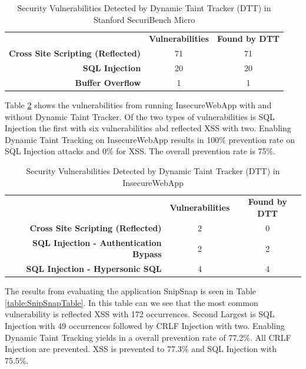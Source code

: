 \begin{table}[!hbt]
  \centering
  \caption{Security Vulnerabilities Detected by Dynamic Taint Tracker (DTT) in Stanford SecuriBench Micro}
  \label{table:MicroTable}
    \begin{tabular}{rcc}
      & \textbf{Vulnerabilities} & \textbf{Found by DTT} \\
      \textbf{Cross Site Scripting (Reflected)} & 71            & 71  \\
      \textbf{SQL Injection}                    & 20            & 20  \\
      \textbf{Buffer Overflow}                  & 1             & 1  
    \end{tabular}
\end{table}

Table \ref{table:InsecureTable} shows the vulnerabilities from running InsecureWebApp \parencite{insecure} with and without Dynamic Taint Tracker. Of the two types of vulnerabilities is SQL Injection the first with six vulnerabilities abd reflected XSS with two. Enabling Dynamic Taint Tracking on InsecureWebApp \parencite{insecure} results in 100\% prevention rate on SQL Injection attacks and 0\% for XSS. The overall prevention rate is 75\%. 

\begin{table}[!hbt]
  \centering
  \caption{Security Vulnerabilities Detected by Dynamic Taint Tracker (DTT) in InsecureWebApp}
  \label{table:InsecureTable}
    \begin{tabular}{rcc}
      & \textbf{Vulnerabilities} & \textbf{Found by DTT} \\
      \textbf{Cross Site Scripting (Reflected)}      & 2             & 0  \\
      \textbf{SQL Injection - Authentication Bypass} & 2             & 2  \\
      \textbf{SQL Injection - Hypersonic SQL}        & 4             & 4  
    \end{tabular}
\end{table}

The results from evaluating the application SnipSnap \parencite{snipsnap} is seen in Table \ref{table:SnipSnapTable}. In this table can we see that the most common vulnerability is reflected XSS with 172 occurrences. Second Largest is SQL Injection with 49 occurrences followed by CRLF Injection with two. Enabling Dynamic Taint Tracking yields in a overall prevention rate of 77.2\%. All CRLF Injection are prevented. XSS is prevented to 77.3\% and SQL Injection with 75.5\%.

